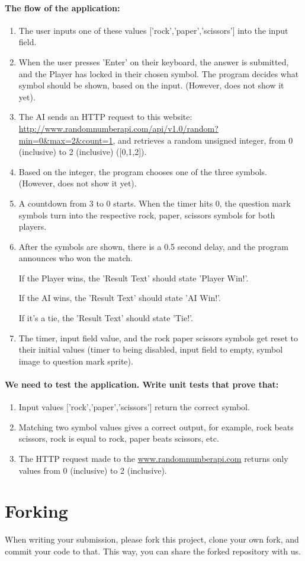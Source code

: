 \documentclass[12pt]{article}
\begin{document}
\clearpage
\paragraph*{The flow of the application:}
\begin{enumerate}
    \item The user inputs one of these values ['rock','paper','scissors'] into the input field.
    \item When the user presses 'Enter' on their keyboard, the answer is submitted, and the Player has locked in their chosen symbol. The program decides what symbol should be shown, based on the input. (However, does not show it yet).
    \item The AI sends an HTTP request to this website:
          \url{http://www.randomnumberapi.com/api/v1.0/random?min=0&max=2&count=1},
          and retrieves a random unsigned integer, from 0 (inclusive) to 2 (inclusive) ([0,1,2]).
    \item Based on the integer, the program chooses one of the three symbols. (However, does not show it yet).
    \item A countdown from 3 to 0 starts.
          When the timer hits 0, the question mark symbols turn into the respective rock, paper, scissors symbols for both players.
    \item After the symbols are shown, there is a 0.5 second delay, and the program announces who won the match. \par
          If the Player wins, the 'Result Text' should state 'Player Win!'. \par
          If the AI wins, the 'Result Text' should state 'AI Win!'. \par
          If it's a tie, the 'Result Text' should state 'Tie!'. \par
    \item The timer, input field value, and the rock paper scissors symbols get reset to their initial values (timer to being disabled, input field to empty, symbol image to question mark sprite).
\end{enumerate}

\paragraph*{We need to test the application. Write unit tests that prove that:}
\begin{enumerate}
    \item Input values ['rock','paper','scissors'] return the correct symbol.
    \item Matching two symbol values gives a correct output, for example, rock beats scissors, rock is equal to rock, paper beats scissors, etc.
    \item The HTTP request made to the \url{www.randomnumberapi.com} returns only values from 0 (inclusive) to 2 (inclusive).
\end{enumerate}

\section{Forking}
When writing your submission, please fork this project, clone your own fork, and commit your code to that. This way, you can share the forked repository with us.
\end{document}
